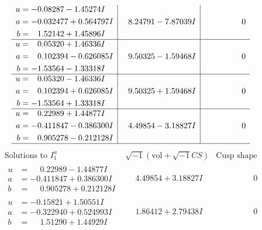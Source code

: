 \documentclass[1p]{elsarticle_modified}
\theoremstyle{definition}
\newcommand{\I}{\sqrt{-1}}
\begin{document}
$$\begin{array}{c|c|c}
\begin{aligned}
u &= -0.08287 - 1.45274 I \\
a &= -0.032477 + 0.564797 I \\
b &= \phantom{-}1.52142 + 1.45896 I\end{aligned}
 & \phantom{-}8.24791 - 7.87039 I & \phantom{-0.000000 } 0 \\ \hline\begin{aligned}
u &= \phantom{-}0.05320 + 1.46336 I \\
a &= \phantom{-}0.102394 - 0.626085 I \\
b &= -1.53564 - 1.33318 I\end{aligned}
 & \phantom{-}9.50325 - 1.59468 I & \phantom{-0.000000 } 0 \\ \hline\begin{aligned}
u &= \phantom{-}0.05320 - 1.46336 I \\
a &= \phantom{-}0.102394 + 0.626085 I \\
b &= -1.53564 + 1.33318 I\end{aligned}
 & \phantom{-}9.50325 + 1.59468 I & \phantom{-0.000000 } 0 \\ \hline\begin{aligned}
u &= \phantom{-}0.22989 + 1.44877 I \\
a &= -0.411847 - 0.386300 I \\
b &= \phantom{-}0.905278 - 0.212128 I\end{aligned}
 & \phantom{-}4.49854 - 3.18827 I & \phantom{-0.000000 } 0\\
 \hline 
 \end{array}$$\newpage$$\begin{array}{c|c|c}  
\text{Solutions to }I^u_{1}& \I (\text{vol} + \sqrt{-1}CS) & \text{Cusp shape}\\
 \hline 
\begin{aligned}
u &= \phantom{-}0.22989 - 1.44877 I \\
a &= -0.411847 + 0.386300 I \\
b &= \phantom{-}0.905278 + 0.212128 I\end{aligned}
 & \phantom{-}4.49854 + 3.18827 I & \phantom{-0.000000 } 0 \\ \hline\begin{aligned}
u &= -0.15821 + 1.50551 I \\
a &= -0.322940 + 0.524993 I \\
b &= \phantom{-}1.51290 + 1.44929 I\end{aligned}
 & \phantom{-}1.86412 + 2.79438 I & \phantom{-0.000000 } 0 \\ \hline\begin{aligned}

\end{aligned}
\end{array}$$
\end{document}
